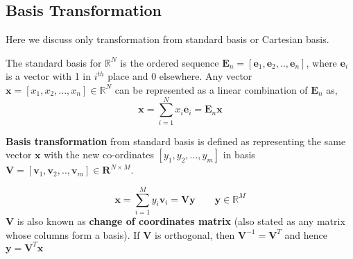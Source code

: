 

\begin{appendices}

\chapter{}
\section{Basis Transformation}

Here we discuss only transformation from standard \gls{basis} or Cartesian \gls{basis}.
\bigskip

\noindent The standard \gls{basis} for $\mathbb{R}^{N}$ is the ordered sequence $\textbf{E}_{n} = [\textbf{e}_{1}, \textbf{e}_{2}, ..,\textbf{e}_{n}]$, where $\textbf{e}_{i}$ is a vector with 1 in $\textit{i}^{th}$ place and 0 elsewhere. Any vector $\textbf{x} = [x_{1}, x_{2},...,x_{n}] \in \mathbb{R}^{N}$ can be represented as a \gls{linear combination} of $\textbf{E}_{n}$ as,
\[
\textbf{x} = \displaystyle\sum_{i=1}^{N}x_{i}\textbf{e}_{i} = \textbf{E}_{n}\textbf{x}
\]

\noindent \textbf{Basis transformation} from standard \gls{basis} is defined as representing the same vector $\textbf{x}$ with the new co-ordinates $[y_{1}, y_{2},...,y_{m}]$ in \gls{basis} $\textbf{V} = [\textbf{v}_{1}, \textbf{v}_{2}, ..,\textbf{v}_{m}] \in \textbf{R}^{N \times M} $.
\bigskip

\[
\textbf{x} = \displaystyle\sum_{i=1}^{M}y_{i}\textbf{v}_{i} = \textbf{V}\textbf{y} \qquad \textbf{y} \in \mathbb{R}^{M}
\]
$\textbf{V}$ is also known as \textbf{change of coordinates matrix} (also stated as any matrix whose columns form a \gls{basis}). If $\textbf{V}$ is orthogonal, then $\textbf{V}^{-1} = \textbf{V}^{T}$ and hence $\textbf{y} = \textbf{V}^{T}\textbf{x}$
\end{appendices}